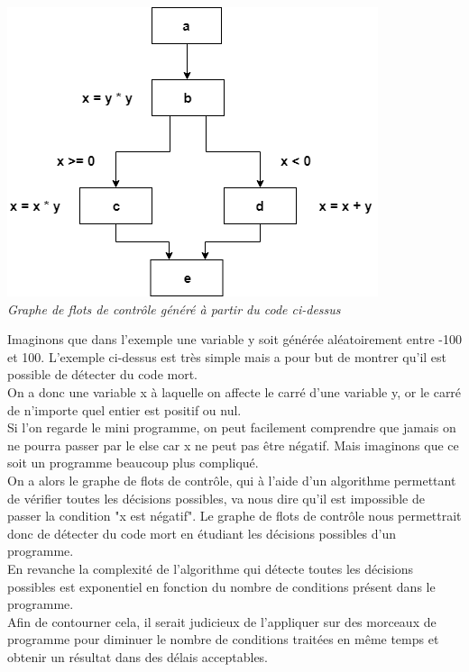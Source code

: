\documentclass[a4paper,twoside,12pt,openright]{report}
\begin{document}
\begin{center}
\includegraphics[scale=1]{Image/ExempleGraphe.png}\\
\itshape{Graphe de flots de contrôle généré à partir du code ci-dessus}
\end{center}

Imaginons que dans l'exemple une variable y soit générée aléatoirement entre -100 et 100.
L'exemple ci-dessus est très simple mais a pour but de montrer qu'il est possible de détecter du code mort.\\
On a donc une variable x à laquelle on affecte le carré d'une variable y, or le carré de n'importe quel entier est positif ou nul.\\ Si l'on regarde le mini programme, on peut facilement comprendre que jamais on ne pourra passer par le else car x ne peut pas être négatif. Mais imaginons que ce soit un programme beaucoup plus compliqué.\\ On a alors le graphe de flots de contrôle, qui à l'aide d'un algorithme permettant de vérifier toutes les décisions possibles, va nous dire qu'il est impossible de passer la condition "x est négatif". Le graphe de flots de contrôle nous permettrait donc de détecter du code mort en étudiant les décisions possibles d'un programme.\\
En revanche la complexité de l'algorithme qui détecte toutes les décisions possibles est exponentiel en fonction du nombre de conditions présent dans le programme.\\
Afin de contourner cela, il serait judicieux de l'appliquer sur des morceaux de programme pour diminuer le nombre de conditions traitées en même temps et obtenir un résultat dans des délais acceptables.\\
\end{document}
